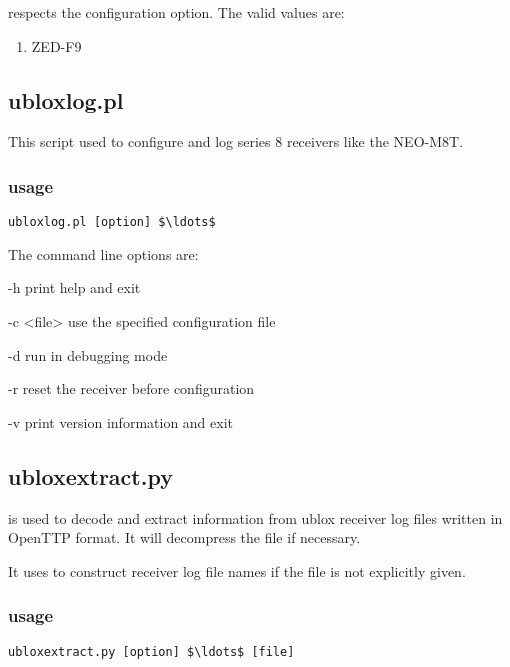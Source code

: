 respects the  configuration option.
The valid values are:
\begin{enumerate}
	\item ZED-F9
\end{enumerate}

\subsection{ubloxlog.pl} \hypertarget{h:ubloxlog}{}

This script used to configure and log series 8 receivers like the NEO-M8T.

\subsubsection{usage}

\begin{lstlisting}[mathescape=true]
ubloxlog.pl [option] $\ldots$ 
\end{lstlisting}

The command line options are:
\begin{description*}
	\item[-h] print help and exit
	\item[-c \textless file\textgreater] use the specified configuration file
	\item[-d] run in debugging mode
	\item[-r]  reset the receiver before configuration
	\item[-v] print version information and exit
\end{description*}

\subsection{ubloxextract.py} \hypertarget{h:ubloxextract}{}

 is used to decode and extract information from ublox receiver log files 
written in OpenTTP format. It will decompress the file if necessary.

It uses  to construct receiver log file names if the file is not explicitly given.

\subsubsection{usage}

\begin{lstlisting}[mathescape=true]
ubloxextract.py [option] $\ldots$ [file]
\end{lstlisting}

